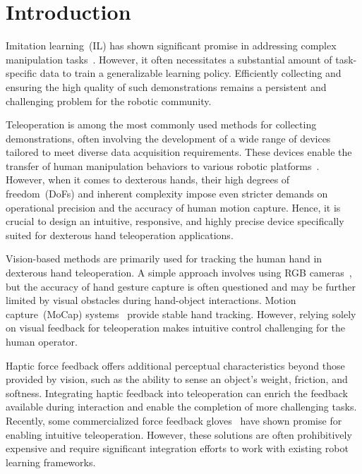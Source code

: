 
\section{Introduction}

Imitation learning~(IL) has shown significant promise in addressing complex manipulation tasks~\cite{chi2023diffusion,chi2024universal,zhao2023learning,Ze2024DP3}. However, it often necessitates a substantial amount of task-specific data to train a generalizable learning policy. Efficiently collecting and ensuring the high quality of such demonstrations remains a persistent and challenging problem for the robotic community.

Teleoperation is among the most commonly used methods for collecting demonstrations, often involving the development of a wide range of devices tailored to meet diverse data acquisition requirements. These devices enable the transfer of human manipulation behaviors to various robotic platforms~\cite{fu2024mobile, fang2024airexo,cheng2024open,ding2024bunny,iyer2024open}.
%
However, when it comes to dexterous hands, their high degrees of freedom~(DoFs) and inherent complexity impose even stricter demands on operational precision and the accuracy of human motion capture. Hence, it is crucial to design an intuitive, responsive, and highly precise device specifically suited for dexterous hand teleoperation applications.

Vision-based methods are primarily used for tracking the human hand in dexterous hand teleoperation. A simple approach involves using RGB cameras~\cite{qin2023anyteleop,ultraleap}, but the accuracy of hand gesture capture is often questioned and may be further limited by visual obstacles during hand-object interactions. Motion capture~(MoCap) systems~\cite{OptiTrack,Vicon,santaera2015low,wang2024dexcap} provide stable hand tracking. However, relying solely on visual feedback for teleoperation makes intuitive control challenging for the human operator.

Haptic force feedback offers additional perceptual characteristics beyond those provided by vision, such as the ability to sense an object's weight, friction, and softness. Integrating haptic feedback into teleoperation can enrich the feedback available during interaction and enable the completion of more challenging tasks. Recently, some commercialized force feedback gloves~\cite{dextarobotics, senseglove, manusmeta, haptx} have shown promise for enabling intuitive teleoperation. However, these solutions are often prohibitively expensive and require significant integration efforts to work with existing robot learning frameworks.


